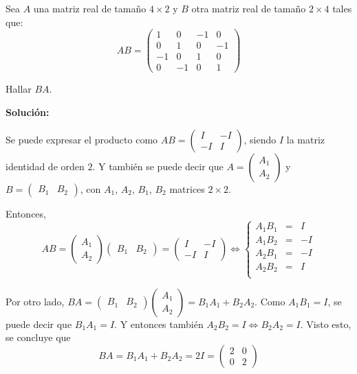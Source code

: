 \documentclass[../../main.tex]{subfiles}
\begin{document}
  \begin{shaded}
    Sea $A$ una matriz real de tamaño $4 \times 2$ y $B$ otra matriz real de tamaño $2 \times 4$ tales que:
    $$
    A B =
    \begin{pmatrix}
      1 &  0 & -1 &  0 \\
      0 &  1 &  0 & -1 \\
      -1 &  0 &  1 &  0 \\
      0 & -1 &  0 &  1
    \end{pmatrix}
    $$

    Hallar $B A$.
  \end{shaded}

  \textbf{Solución:}

  Se puede expresar el producto como $
  A B =
  \begin{pmatrix}
    I & -I \\
    -I &  I
  \end{pmatrix}
  $, siendo $I$ la matriz identidad de orden $2$. Y también se puede decir que $A = \begin{pmatrix} A_1 \\ A_2 \end{pmatrix}$ y $B = \begin{pmatrix} B_1 & B_2 \end{pmatrix}$, con $A_1$, $A_2$, $B_1$, $B_2$ matrices $2 \times 2$.

  Entonces,
  $$
  A B =
  \begin{pmatrix} A_1 \\ A_2 \end{pmatrix}
  \begin{pmatrix} B_1 & B_2 \end{pmatrix} =
  \begin{pmatrix}
    I & -I \\
    -I &  I
  \end{pmatrix}
  \iff
  \left \{
  \begin{matrix}
    A_1 B_1 & = &  I \\
    A_1 B_2 & = & -I \\
    A_2 B_1 & = & -I \\
    A_2 B_2 & = &  I \\
  \end{matrix}
  \right .
  $$

  Por otro lado, $B A = \begin{pmatrix} B_1 & B_2 \end{pmatrix} \begin{pmatrix} A_1 \\ A_2 \end{pmatrix} = B_1 A_1 + B_2 A_2$. Como $A_1 B_1 = I$, se puede decir que $B_1 A_1 = I$. Y entonces también $A_2 B_2 = I \iff B_2 A_2 = I$. Visto esto, se concluye que
  $$
  B A = B_1 A_1 + B_2 A_2 = 2 I =
  \begin{pmatrix}
    2 & 0 \\
    0 & 2
  \end{pmatrix}
  $$
\end{document}
